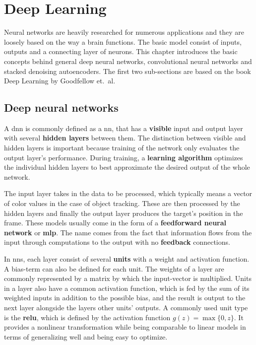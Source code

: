 \section{Deep Learning}

Neural networks are heavily researched for numerous applications and they are loosely
based on the way a brain functions. The basic model consist of inputs, outputs and a
connecting layer of neurons. This chapter introduces the basic concepts behind general
deep neural networks, convolutional neural networks and stacked denoising autoencoders.
The first two sub-sections are based on the book Deep Learning by Goodfellow et.~al.
~\cite{DEEP_LEARNING}

\subsection{Deep neural networks}

A \ac{dnn} is commonly defined as a \ac{nn}, that has a \textbf{visible} input and
output layer with several \textbf{hidden layers} between them. The distinction between
visible and hidden layers is important because training of the network only evaluates
the output layer's performance. During training, a \textbf{learning algorithm} optimizes
the individual hidden layers to best approximate the desired output of the whole network.

The input layer takes in the data to be processed, which typically means a vector of
color values in the case of object tracking. These are then processed by the hidden
layers and finally the output layer produces the target's position in the frame. These
models usually come in the form of a \textbf{feedforward neural network} or
\textbf{\ac{mlp}}. The name comes from the fact that information flows from the input
through computations to the output with no \textbf{feedback} connections.

In \ac{nn}s, each layer consist of several \textbf{units} with a weight and activation
function. A bias-term can also be defined for each unit. The weights of a layer are
commonly represented by a matrix by which the input-vector is multiplied. Units in a
layer also have a common activation function, which is fed by the sum of its weighted
inputs in addition to the possible bias, and the result is output to the next layer
alongside the layers other units' outputs. A commonly used unit type is the \textbf{\ac{relu}},
which is defined by the activation function $g (z) = \max\{0,z\}$. It provides a
nonlinear transformation while being comparable to linear models in terms of generalizing
well and being easy to optimize.

